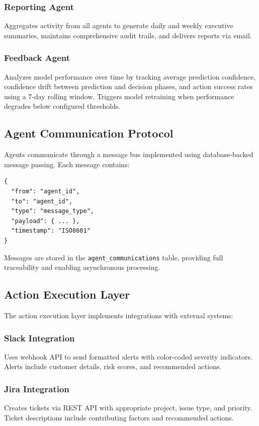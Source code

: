 \documentclass[conference]{IEEEtran}
\begin{document}
\subsubsection{Reporting Agent}
Aggregates activity from all agents to generate daily and weekly executive summaries, maintains comprehensive audit trails, and delivers reports via email.

\subsubsection{Feedback Agent}
Analyzes model performance over time by tracking average prediction confidence, confidence drift between prediction and decision phases, and action success rates using a 7-day rolling window. Triggers model retraining when performance degrades below configured thresholds.

\subsection{Agent Communication Protocol}
Agents communicate through a message bus implemented using database-backed message passing. Each message contains:

\begin{lstlisting}[]
{
  "from": "agent_id",
  "to": "agent_id",
  "type": "message_type",
  "payload": { ... },
  "timestamp": "ISO8601"
}
\end{lstlisting}

Messages are stored in the \texttt{agent\_communications} table, providing full traceability and enabling asynchronous processing.

\subsection{Action Execution Layer}
The action execution layer implements integrations with external systems:

\subsubsection{Slack Integration}
Uses webhook API to send formatted alerts with color-coded severity indicators. Alerts include customer details, risk scores, and recommended actions.

\subsubsection{Jira Integration}
Creates tickets via REST API with appropriate project, issue type, and priority. Ticket descriptions include contributing factors and recommended actions.
\end{document}
